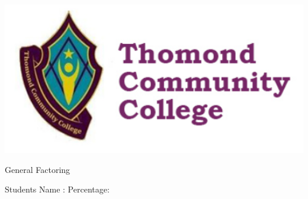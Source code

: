 \documentclass[12pt, a4paper]{exam}
\begin{document}
\vspace{7mm}
	\noindent
	\begin{minipage}[l]{.25\textwidth}
		\noindent
		\includegraphics[width=1\textwidth]{logo.png}
	{\large \begin{center}
\Large	
General Factoring


	\end{center} 
	}
	\end{minipage}
\hfill
\begin{minipage}[c]{0.75\textwidth} \large
  \hspace{.3cm}  Students Name :\hspace{6cm} Percentage:
	\begin{center}
\addpoints
{}
\gradetable[h][questions]
\noindent
	\end{center}
\end{minipage}
\vspace{0.14in}
\end{document}
